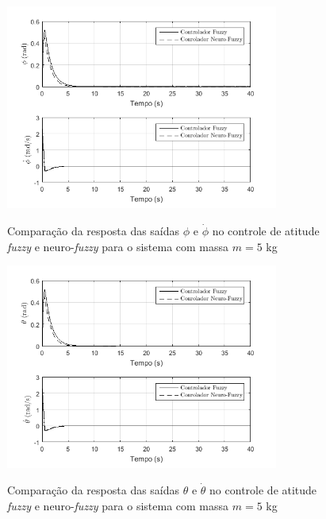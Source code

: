 \begin{figure}[!htb]
    \centering
    \caption{Comparação da resposta das saídas $\phi$ e $\dot{\phi}$ no controle de atitude \textit{fuzzy} e neuro-\textit{fuzzy} para o sistema com massa $m=5$ kg}
    \includegraphics[width=0.8\textwidth]{./04-figuras/resultados/novos/atitude_phi_phidot_5kg_40s}
    \label{fig:atitude_phi_phidot_5kg_40s}
\end{figure}

\begin{figure}[!htb]
    \centering
    \caption{Comparação da resposta das saídas $\theta$ e $\dot{\theta}$ no controle de atitude \textit{fuzzy} e neuro-\textit{fuzzy} para o sistema com massa $m=5$ kg}
    \includegraphics[width=0.8\textwidth]{./04-figuras/resultados/novos/atitude_theta_thetadot_5kg_40s}
    \label{fig:atitude_theta_thetadot_5kg_40s}
\end{figure}

